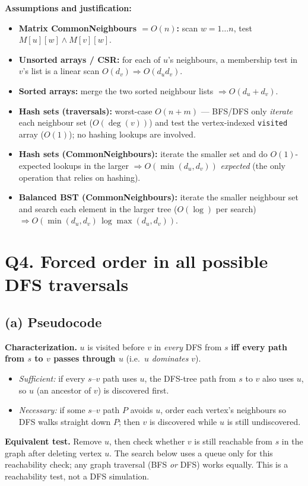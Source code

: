 \documentclass[11pt]{article}
\begin{document}
\noindent\textbf{Assumptions and justification:}
\begin{itemize}[nosep]
  \item \textbf{Matrix CommonNeighbours $=O(n)$:} scan $w=1\ldots n$, test $M[u][w]\wedge M[v][w]$.
  \item \textbf{Unsorted arrays / CSR:} for each of $u$'s neighbours, a membership test in
    $v$'s list is a linear scan $O(d_v)\Rightarrow O(d_u d_v)$.
  \item \textbf{Sorted arrays:} merge the two sorted neighbour lists $\Rightarrow O(d_u+d_v)$.
  \item \textbf{Hash sets (traversals):} worst-case $O(n + m)$ --- BFS/DFS only \emph{iterate}
    each neighbour set ($O(\deg(v))$) and test the vertex-indexed \texttt{visited} array ($O(1)$);
    no hashing lookups are involved.
  \item \textbf{Hash sets (CommonNeighbours):} iterate the smaller set and do
    $O(1)$-expected lookups in the larger $\Rightarrow O(\min(d_u,d_v))$
    \emph{expected} (the only operation that relies on hashing).
  \item \textbf{Balanced BST (CommonNeighbours):} iterate the smaller neighbour set and search each
    element in the larger tree ($O(\log)$ per search) $\Rightarrow
    O(\min(d_u,d_v)\,\log\max(d_u,d_v))$.
\end{itemize}

\section*{Q4. Forced order in all possible DFS traversals}

\subsection*{(a) Pseudocode}

\textbf{Characterization.} $u$ is visited before $v$ in \emph{every} DFS from $s$
\textbf{iff every path from $s$ to $v$ passes through $u$} (i.e.\ $u$ \emph{dominates} $v$).
\begin{itemize}[nosep]
  \item \emph{Sufficient:} if every $s$--$v$ path uses $u$, the DFS-tree path from $s$ to
    $v$ also uses $u$, so $u$ (an ancestor of $v$) is discovered first.
  \item \emph{Necessary:} if some $s$--$v$ path $P$ avoids $u$, order each vertex's
    neighbours so DFS walks straight down $P$; then $v$ is discovered while $u$ is still
    undiscovered.
\end{itemize}
\textbf{Equivalent test.} Remove $u$, then check whether $v$ is still reachable from $s$
in the graph after deleting vertex $u$.
The search below uses a queue only for this reachability check; any graph traversal
(BFS \emph{or} DFS) works equally. This is a reachability test, not a DFS simulation.
\end{document}
